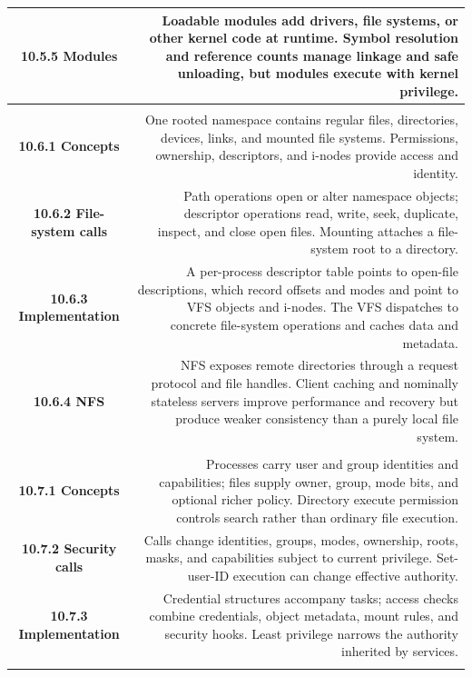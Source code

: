 \documentclass[10pt,letterpaper]{article}
\begin{document}
\begin{longtable}{C N}
\textbf{10.5.5 Modules} & Loadable modules add drivers, file systems, or other kernel code at runtime. Symbol resolution and reference counts manage linkage and safe unloading, but modules execute with kernel privilege.\\\hline
{}\\*\hline
\textbf{10.6.1 Concepts} & One rooted namespace contains regular files, directories, devices, links, and mounted file systems. Permissions, ownership, descriptors, and i-nodes provide access and identity.\\\hline
\textbf{10.6.2 File-system calls} & Path operations open or alter namespace objects; descriptor operations read, write, seek, duplicate, inspect, and close open files. Mounting attaches a file-system root to a directory.\\\hline
\textbf{10.6.3 Implementation} & A per-process descriptor table points to open-file descriptions, which record offsets and modes and point to VFS objects and i-nodes. The VFS dispatches to concrete file-system operations and caches data and metadata.\\\hline
\textbf{10.6.4 NFS} & NFS exposes remote directories through a request protocol and file handles. Client caching and nominally stateless servers improve performance and recovery but produce weaker consistency than a purely local file system.\\\hline
{}\\*\hline
\textbf{10.7.1 Concepts} & Processes carry user and group identities and capabilities; files supply owner, group, mode bits, and optional richer policy. Directory execute permission controls search rather than ordinary file execution.\\\hline
\textbf{10.7.2 Security calls} & Calls change identities, groups, modes, ownership, roots, masks, and capabilities subject to current privilege. Set-user-ID execution can change effective authority.\\\hline
\textbf{10.7.3 Implementation} & Credential structures accompany tasks; access checks combine credentials, object metadata, mount rules, and security hooks. Least privilege narrows the authority inherited by services.\\\hline
{}\\*\hline

\end{longtable}
\end{document}
